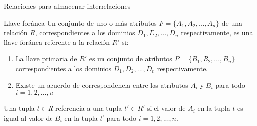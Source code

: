 \begin{frame}{Relaciones para almacenar interrelaciones}
    \begin{block}{Llave for\'anea}
        Un conjunto de uno o m\'as atributos $F = \{A_1, A_2,...,A_n\}$ de una relaci\'on $R$, correspondientes
        a los dominios $D_1, D_2,...,D_n$ respectivamente, es una llave for\'anea referente a la relaci\'on $R'$ si:
        \begin{enumerate}
            \item La llave primaria de $R'$ es un conjunto de atributos $P = \{B_1,B_2,...,B_n\}$ correspondientes
            a los dominios $D_1,D_2,...,D_n$ respectivamente.
            \item Existe un acuerdo de correspondencia entre los atributos $A_i$ y $B_i$ para todo $i = 1,2,...,n$
           
        \end{enumerate}

        Una tupla $t \in R$ referencia a una tupla $t' \in R'$ si el valor de $A_i$ en la tupla $t$ es igual al valor
        de $B_i$ en la tupla $t'$ para todo $i=1,2,...,n$.
    \end{block}

\end{frame}

